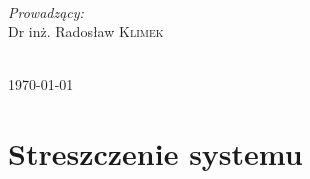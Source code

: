 \documentclass[a4paper, 11pt]{article}
\begin{document}
\begin{titlepage}
\begin{minipage}{0.4\textwidth}
\begin{flushleft}
\end{flushleft}
\end{minipage}
~
\begin{minipage}{0.4\textwidth}
\begin{flushright} \large
\emph{Prowadzący:}\\
 Dr inż. Radosław \textsc{Klimek}  %
\end{flushright}
\end{minipage} \\[5cm]

		
		
		{\large \today}\\[3cm] %
		
		
		
		
		\vfill %
		
	\end{titlepage}
	
	
	\tableofcontents
	\vfill

	\newpage
	
	\section{Streszczenie systemu}
	\indent
	
\end{document}

